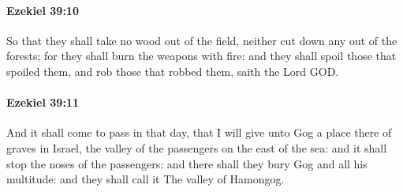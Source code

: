		\paragraph{Ezekiel 39:10} %
			\label{EZEKIEL-39-10}

			So that they shall take no wood out of the field, neither cut down any out of the forests; for they shall burn the weapons with fire: and they shall spoil those that spoiled them, and rob those that robbed them, saith the Lord GOD.


		\paragraph{Ezekiel 39:11} %
			\label{EZEKIEL-39-11}

			And it shall come to pass in that day, that I will give unto Gog a place there of graves in Israel, the valley of the passengers on the east of the sea: and it shall stop the noses of the passengers: and there shall they bury Gog and all his multitude: and they shall call it The valley of Hamongog.

